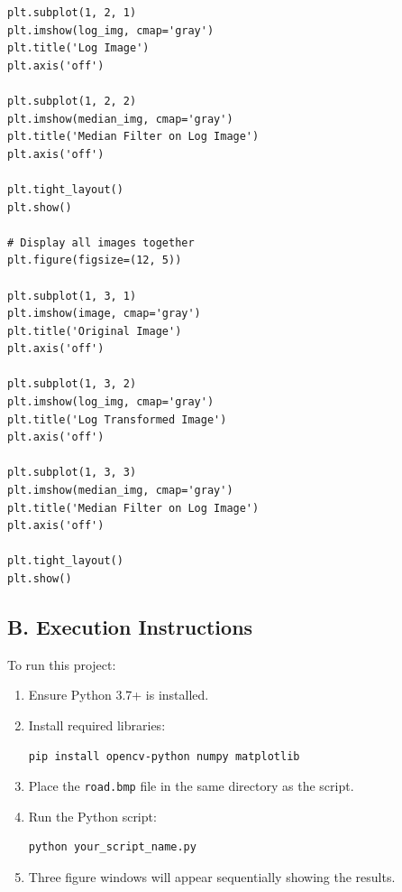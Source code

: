 \documentclass[12pt,a4paper]{article}
\begin{document}
\begin{lstlisting}[caption={Complete Modernized Python Implementation}]
plt.subplot(1, 2, 1)
plt.imshow(log_img, cmap='gray')
plt.title('Log Image')
plt.axis('off')

plt.subplot(1, 2, 2)
plt.imshow(median_img, cmap='gray')
plt.title('Median Filter on Log Image')
plt.axis('off')

plt.tight_layout()
plt.show()

# Display all images together
plt.figure(figsize=(12, 5))

plt.subplot(1, 3, 1)
plt.imshow(image, cmap='gray')
plt.title('Original Image')
plt.axis('off')

plt.subplot(1, 3, 2)
plt.imshow(log_img, cmap='gray')
plt.title('Log Transformed Image')
plt.axis('off')

plt.subplot(1, 3, 3)
plt.imshow(median_img, cmap='gray')
plt.title('Median Filter on Log Image')
plt.axis('off')

plt.tight_layout()
plt.show()
\end{lstlisting}

\subsection*{B. Execution Instructions}
{}

To run this project:
\begin{enumerate}
    \item Ensure Python 3.7+ is installed.
    \item Install required libraries:
    \begin{lstlisting}[language=bash, numbers=none]
pip install opencv-python numpy matplotlib
    \end{lstlisting}
    \item Place the \texttt{road.bmp} file in the same directory as the script.
    \item Run the Python script:
    \begin{lstlisting}[language=bash, numbers=none]
python your_script_name.py
    \end{lstlisting}
    \item Three figure windows will appear sequentially showing the results.
\end{enumerate}
\end{document}
